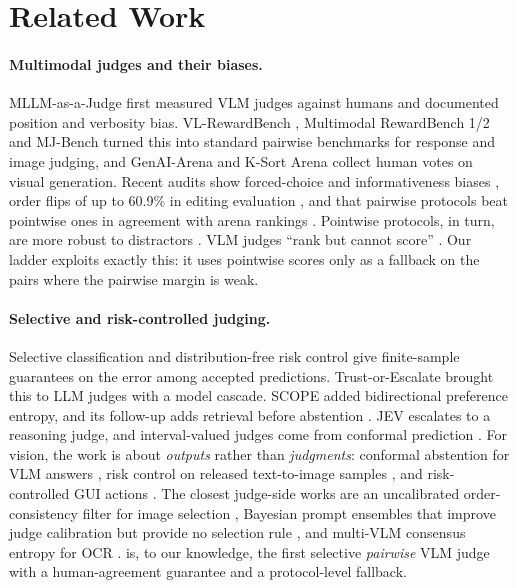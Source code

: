 \section{Related Work}\label{sec:related}

\paragraph{Multimodal judges and their biases.}
MLLM-as-a-Judge \citep{chen2024mllmasajudge} first measured VLM judges against humans and documented position and verbosity bias. VL-RewardBench \citep{li2024vlrewardbench}, Multimodal RewardBench 1/2 \citep{yasunaga2025multimodal,hu2025multimodal} and MJ-Bench \citep{chen2024mjbench} turned this into standard pairwise benchmarks for response and image judging, and GenAI-Arena \citep{jiang2024genai} and K-Sort Arena \citep{li2024ksort} collect human votes on visual generation.
Recent audits show forced-choice and informativeness biases \citep{khan2026seeing,zou2026when}, order flips of up to 60.9\% in editing evaluation \citep{huang2026do}, and that pairwise protocols beat pointwise ones in agreement with arena rankings \citep{li2026genarena}. Pointwise protocols, in turn, are more robust to distractors \citep{tripathi2025pairwise}.
VLM judges ``rank but cannot score'' \citep{kumar2026vlm}. Our ladder exploits exactly this: it uses pointwise scores only as a fallback on the pairs where the pairwise margin is weak.

\paragraph{Selective and risk-controlled judging.}
Selective classification \citep{geifman2017selective} and distribution-free risk control \citep{angelopoulos2021learn,angelopoulos2022conformal} give finite-sample guarantees on the error among accepted predictions.
Trust-or-Escalate \citep{jung2024trust} brought this to LLM judges with a model cascade. SCOPE \citep{badshah2026scope} added bidirectional preference entropy, and its follow-up adds retrieval before abstention \citep{badshah2026judge}. JEV \citep{li2026jevasajudge} escalates to a reasoning judge, and interval-valued judges come from conformal prediction \citep{sheng2025analyzing}.
For vision, the work is about \emph{outputs} rather than \emph{judgments}: conformal abstention for VLM answers \citep{tayebati2025learning}, risk control on released text-to-image samples \citep{yin2026calibrate}, and risk-controlled GUI actions \citep{feng2026cora}.
The closest judge-side works are an uncalibrated order-consistency filter for image selection \citep{seo2026when}, Bayesian prompt ensembles that improve judge calibration but provide no selection rule \citep{slyman2025calibrating}, and multi-VLM consensus entropy for OCR \citep{zhang2025consensus}.
\eaglev{} is, to our knowledge, the first selective \emph{pairwise} VLM judge with a human-agreement guarantee and a protocol-level fallback.

